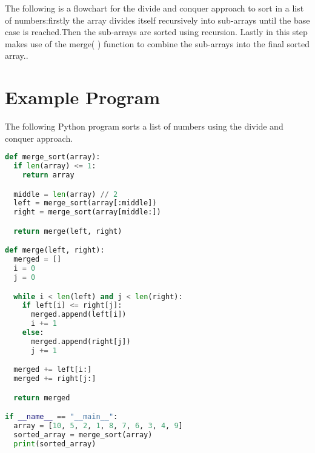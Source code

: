\documentclass[10pt]{article}
\begin{document}
The following is a flowchart for the divide and conquer approach to sort in a list of numbers:firstly  the array divides itself recursively into sub-arrays until the base case is reached.Then the sub-arrays are sorted using recursion.
Lastly in this step makes use of the merge( ) function to combine the sub-arrays into the final sorted array..
\begin{center}
\end{center}
\pagebreak

\section{Example Program}

The following Python program sorts a list of numbers using the divide and conquer approach.

\begin{lstlisting}[language=Python]
def merge_sort(array):
  if len(array) <= 1:
    return array

  middle = len(array) // 2
  left = merge_sort(array[:middle])
  right = merge_sort(array[middle:])

  return merge(left, right)

def merge(left, right):
  merged = []
  i = 0
  j = 0

  while i < len(left) and j < len(right):
    if left[i] <= right[j]:
      merged.append(left[i])
      i += 1
    else:
      merged.append(right[j])
      j += 1

  merged += left[i:]
  merged += right[j:]

  return merged

if __name__ == "__main__":
  array = [10, 5, 2, 1, 8, 7, 6, 3, 4, 9]
  sorted_array = merge_sort(array)
  print(sorted_array)

\end{lstlisting}
\end{document}
